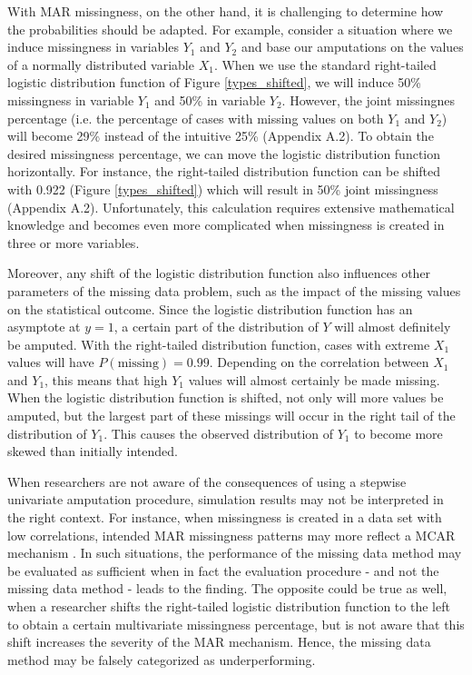 \documentclass[11pt,a4paper]{article}
\begin{document}
With MAR missingness, on the other hand, it is challenging to determine how the probabilities should be adapted. For example, consider a situation where we induce missingness in variables $Y_1$ and $Y_2$ and base our amputations on the values of a normally distributed variable $X_1$. When we use the standard right-tailed logistic distribution function of Figure \ref{types_shifted}, we will induce 50\% missingness in variable $Y_1$ and 50\% in variable $Y_2$. However, the joint missingnes percentage (i.e. the percentage of cases with missing values on both $Y_1$ and $Y_2$) will become 29\% instead of the intuitive 25\% (Appendix A.2). To obtain the desired missingness percentage, we can move the logistic distribution function horizontally. For instance, the right-tailed distribution function can be shifted with 0.922 (Figure \ref{types_shifted}) which will result in 50\% joint missingness (Appendix A.2). Unfortunately, this calculation requires extensive mathematical knowledge and becomes even more complicated when missingness is created in three or more variables. 

Moreover, any shift of the logistic distribution function also influences other parameters of the missing data problem, such as the impact of the missing values on the statistical outcome. Since the logistic distribution function has an asymptote at $y = 1$, a certain part of the distribution of $Y$ will almost definitely be amputed. With the right-tailed distribution function, cases with extreme $X_1$ values will have $P(\text{missing}) = 0.99$. Depending on the correlation between $X_1$ and $Y_1$, this means that high $Y_1$ values will almost certainly be made missing. When the logistic distribution function is shifted, not only will more values be amputed, but the largest part of these missings will occur in the right tail of the distribution of $Y_1$. This causes the observed distribution of $Y_1$ to become more skewed than initially intended. 

When researchers are not aware of the consequences of using a stepwise univariate amputation procedure, simulation results may not be interpreted in the right context. For instance, when missingness is created in a data set with low correlations, intended MAR missingness patterns may more reflect a MCAR mechanism \citep{Vink2016}. In such situations, the performance of the missing data method may be evaluated as sufficient when in fact the evaluation procedure - and not the missing data method - leads to the finding. The opposite could be true as well, when a researcher shifts the right-tailed logistic distribution function to the left to obtain a certain multivariate missingness percentage, but is not aware that this shift increases the severity of the MAR mechanism. Hence, the missing data method may be falsely categorized as underperforming.
\end{document}
